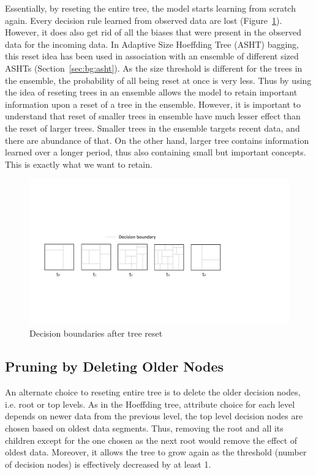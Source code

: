 Essentially, by reseting the entire tree, the model starts learning from scratch again. Every decision rule learned from observed data are lost (Figure~\ref{fig:algo:resetdb}). However, it does also get rid of all the biases that were present in the observed data for the incoming data. In Adaptive Size Hoeffding Tree (ASHT) bagging, this reset idea has been used in association with an ensemble of different sized ASHTs (Section~\ref{sec:bg:asht}). As the size threshold is different for the trees in the ensemble, the probability of all being reset at once is very less. Thus by using the idea of reseting trees in an ensemble allows the model to retain important information upon a reset of a tree in the ensemble. However, it is important to understand that reset of smaller trees in ensemble have much lesser effect than the reset of larger trees. Smaller trees in the ensemble targets recent data, and there are abundance of that. On the other hand, larger tree contains information learned over a longer period, thus also containing small but important concepts. This is exactly what we want to retain.

\begin{figure}[htbp]
    \begin{center}
        \includegraphics[width=14.0cm]{figs/resetdb.pdf}
        \caption{Decision boundaries after tree reset}
        \label{fig:algo:resetdb}
    \end{center}
\end{figure}

\subsection{Pruning by Deleting Older Nodes}
An alternate choice to reseting entire tree is to delete the older decision nodes, i.e. root or top levels. As in the Hoeffding tree, attribute choice for each level depends on newer data from the previous level, the top level decision nodes are chosen based on oldest data segments. Thus, removing the root and all its children except for the one chosen as the next root would remove the effect of oldest data. Moreover, it allows the tree to grow again as the threshold (number of decision nodes) is effectively decreased by at least 1.

